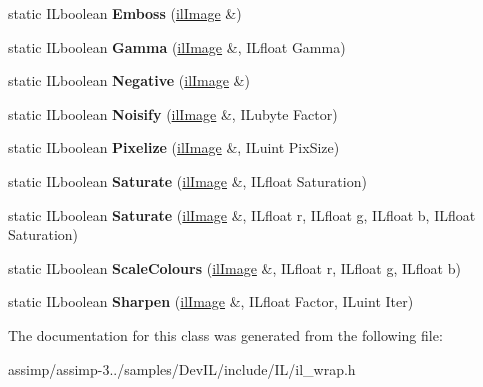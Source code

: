\begin{DoxyCompactItemize}
\item 
\hypertarget{classil_filters_a2fd5e100856cd8295cfbabf36c5d9cce}{static I\+Lboolean {\bfseries Emboss} (\hyperlink{classil_image}{il\+Image} \&)}\label{classil_filters_a2fd5e100856cd8295cfbabf36c5d9cce}

\item 
\hypertarget{classil_filters_a6dd6b152a3cd471042a8bc38d0bc7a7e}{static I\+Lboolean {\bfseries Gamma} (\hyperlink{classil_image}{il\+Image} \&, I\+Lfloat Gamma)}\label{classil_filters_a6dd6b152a3cd471042a8bc38d0bc7a7e}

\item 
\hypertarget{classil_filters_a3d20636ac4a2dc7011c40198931a89b5}{static I\+Lboolean {\bfseries Negative} (\hyperlink{classil_image}{il\+Image} \&)}\label{classil_filters_a3d20636ac4a2dc7011c40198931a89b5}

\item 
\hypertarget{classil_filters_aa14d0e50776475624375fc30f226d6fa}{static I\+Lboolean {\bfseries Noisify} (\hyperlink{classil_image}{il\+Image} \&, I\+Lubyte Factor)}\label{classil_filters_aa14d0e50776475624375fc30f226d6fa}

\item 
\hypertarget{classil_filters_a29550c3adab5f3e24283bb650f67911c}{static I\+Lboolean {\bfseries Pixelize} (\hyperlink{classil_image}{il\+Image} \&, I\+Luint Pix\+Size)}\label{classil_filters_a29550c3adab5f3e24283bb650f67911c}

\item 
\hypertarget{classil_filters_ac2ca65e50864dcd6375412bd4fcd5616}{static I\+Lboolean {\bfseries Saturate} (\hyperlink{classil_image}{il\+Image} \&, I\+Lfloat Saturation)}\label{classil_filters_ac2ca65e50864dcd6375412bd4fcd5616}

\item 
\hypertarget{classil_filters_a7af968f4b03f426cdfa31792addbd2ca}{static I\+Lboolean {\bfseries Saturate} (\hyperlink{classil_image}{il\+Image} \&, I\+Lfloat r, I\+Lfloat g, I\+Lfloat b, I\+Lfloat Saturation)}\label{classil_filters_a7af968f4b03f426cdfa31792addbd2ca}

\item 
\hypertarget{classil_filters_a3df1598d6184b8d0e06514c11cab603a}{static I\+Lboolean {\bfseries Scale\+Colours} (\hyperlink{classil_image}{il\+Image} \&, I\+Lfloat r, I\+Lfloat g, I\+Lfloat b)}\label{classil_filters_a3df1598d6184b8d0e06514c11cab603a}

\item 
\hypertarget{classil_filters_a9baffa0bea289a992575a98350851012}{static I\+Lboolean {\bfseries Sharpen} (\hyperlink{classil_image}{il\+Image} \&, I\+Lfloat Factor, I\+Luint Iter)}\label{classil_filters_a9baffa0bea289a992575a98350851012}

\end{DoxyCompactItemize}


The documentation for this class was generated from the following file\+:\begin{DoxyCompactItemize}
\item 
assimp/assimp-\/3../samples/\+Dev\+I\+L/include/\+I\+L/il\+\_\+wrap.\+h\end{DoxyCompactItemize}
